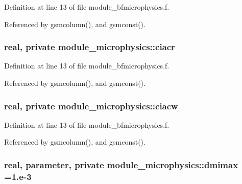 Definition at line 13 of file module\+\_\+bfmicrophysics.\+f.



Referenced by gsmcolumn(), and gsmconst().

\subsubsection[{\texorpdfstring{ciacr}{ciacr}}]{\setlength{\rightskip}{0pt plus 5cm}real, private module\+\_\+microphysics\+::ciacr\hspace{0.3cm}{\ttfamily [private]}}\hypertarget{namespacemodule__microphysics_a1c6192a9baafa2b341b19628e00c19b5}{}\label{namespacemodule__microphysics_a1c6192a9baafa2b341b19628e00c19b5}


Definition at line 13 of file module\+\_\+bfmicrophysics.\+f.



Referenced by gsmcolumn(), and gsmconst().

\subsubsection[{\texorpdfstring{ciacw}{ciacw}}]{\setlength{\rightskip}{0pt plus 5cm}real, private module\+\_\+microphysics\+::ciacw\hspace{0.3cm}{\ttfamily [private]}}\hypertarget{namespacemodule__microphysics_a9e41f7e6287fe7ede81f17b9e041c09e}{}\label{namespacemodule__microphysics_a9e41f7e6287fe7ede81f17b9e041c09e}


Definition at line 13 of file module\+\_\+bfmicrophysics.\+f.



Referenced by gsmcolumn(), and gsmconst().

\subsubsection[{\texorpdfstring{dmimax}{dmimax}}]{\setlength{\rightskip}{0pt plus 5cm}real, parameter, private module\+\_\+microphysics\+::dmimax =1.e-\/3\hspace{0.3cm}{\ttfamily [private]}}\hypertarget{namespacemodule__microphysics_ab71ad8ff5f6f170585e96194373be5cc}{}\label{namespacemodule__microphysics_ab71ad8ff5f6f170585e96194373be5cc}


